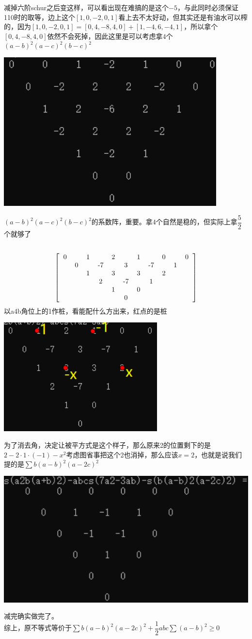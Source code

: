 \documentclass[UTF8]{ctexart}
\begin{document}
减掉六阶schur之后变这样，可以看出现在难搞的是这个$ -5 $，与此同时必须保证110时的取等，边上这个$ [1,0,-2,0,1] $看上去不太好动，但其实还是有油水可以榨的，因为$ [1,0,-2,0,1]=[0,4,-8,4,0]+[1,-4,6,-4,1] $，所以拿个$ [0,4,-8,4,0] $依然不会死掉，因此这里是可以考虑拿$ 4 $个$ (a-b)^{2}(a-c)^{2}(b-c)^{2} $
\begin{center}
	\includegraphics[width=0.4\linewidth]{a13}
\end{center}
$ (a-b)^{2}(a-c)^{2}(b-c)^{2} $的系数阵，重要。拿$ 4 $个自然是稳的，但实际上拿$ \dfrac{5}{2} $个就够了
\subsection{}
\renewcommand*{\arraystretch}{1.732}\[
\left[\begin{matrix}
	\begin{tabular}{ccccccccccccc}
		0& &1& &2& &1& &0& &0\\
		&0& &-7& &3& &-7& &1&\\
		& &1& &3& &3& &2& &\\
		& & &2& &-7& &1& & &\\
		& & & &1& &0& & & &\\
		& & & & &0& & & & &\\
	\end{tabular}
\end{matrix}\right]
\]
以a4b角位上的1作桩，看能配什么方出来，红点的是桩
\begin{center}
	\includegraphics[width=0.4\linewidth]{a14}
\end{center}
为了消去角，决定让被平方式是这个样子，那么原来2的位置剩下的是$ 2-2·1·(-1)-x^{2} $考虑图省事把这个2也消掉，那么应该$ x=2 $，也就是说我们提的是$ \displaystyle \sum b(a-b)^{2}(a-2c)^{2} $
\begin{center}
	\includegraphics[width=0.5\linewidth]{a15}
\end{center}
减完确实做完了。\\
综上，原不等式等价于$ \displaystyle \sum b(a-b)^{2}(a-2c)^{2}+\dfrac{1}{2}abc\displaystyle \sum (a-b)^{2} \geq 0$
\end{document}
